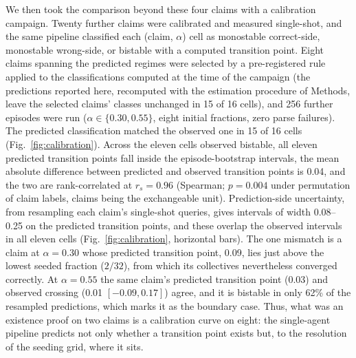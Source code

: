\documentclass[11pt]{article}
\begin{document}
We then took the comparison beyond these four claims with a calibration
campaign. Twenty further claims were calibrated and measured single-shot,
and the same pipeline classified each (claim, $\alpha$) cell as monostable
correct-side, monostable wrong-side, or bistable with a computed transition
point. Eight claims spanning the predicted regimes were selected by a
pre-registered rule applied to the classifications computed at the time of
the campaign (the predictions reported here, recomputed with the estimation
procedure of Methods, leave the selected claims' classes unchanged in 15 of
16 cells), and 256 further episodes were run ($\alpha \in \{0.30, 0.55\}$,
eight initial fractions, zero parse failures). The predicted classification
matched the observed one in 15 of 16 cells (Fig.~\ref{fig:calibration}).
Across the eleven cells observed bistable, all eleven predicted transition
points fall inside the episode-bootstrap intervals, the mean absolute
difference between predicted and observed transition points is 0.04, and
the two are rank-correlated at $r_s = 0.96$ (Spearman; $p = 0.004$ under
permutation of claim labels, claims being the exchangeable unit).
Prediction-side uncertainty, from resampling each claim's single-shot
queries, gives intervals of width 0.08--0.25 on the predicted transition
points, and these overlap the observed intervals in all eleven cells
(Fig.~\ref{fig:calibration}, horizontal bars). The one mismatch is a claim
at $\alpha = 0.30$ whose predicted transition point, 0.09, lies just above
the lowest seeded fraction ($2/32$), from which its collectives
nevertheless converged correctly. At $\alpha = 0.55$ the same claim's
predicted transition point (0.03) and observed crossing (0.01
$[-0.09, 0.17]$) agree, and it is bistable in only 62\% of the resampled
predictions, which marks it as the boundary case. Thus, what was an
existence proof on two claims is a calibration curve on eight: the
single-agent pipeline predicts not only whether a transition point exists
but, to the resolution of the seeding grid, where it sits.
\end{document}
